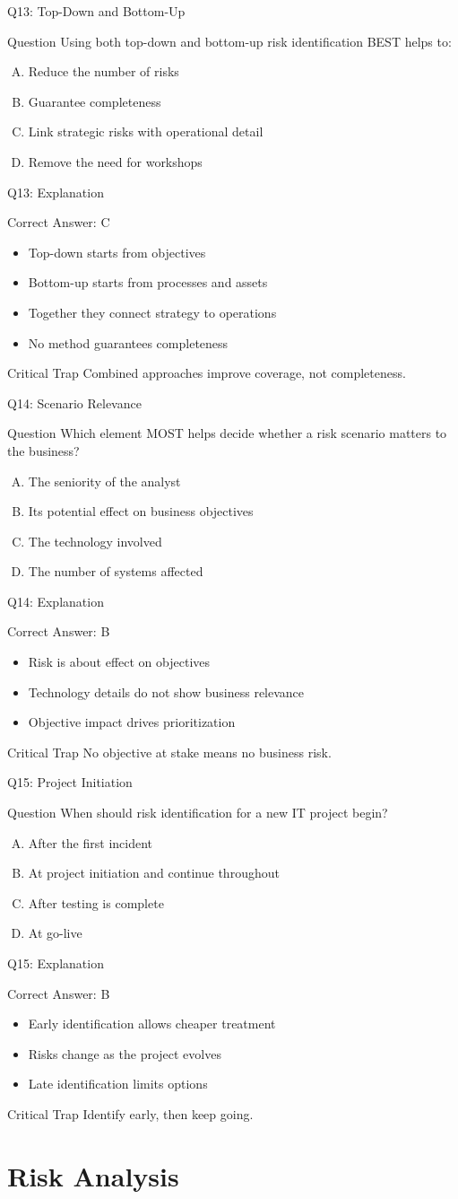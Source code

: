 \documentclass[aspectratio=169]{beamer}
\newcommand{\hq}[7]{%
	\begin{frame}{Q#1: #2}
		\begin{block}{Question}
			#3
		\end{block}
		\begin{enumerate}[(A)]
			#4
		\end{enumerate}
	\end{frame}
	\begin{frame}{Q#1: Explanation}
		\begin{block}{Correct Answer: #5}
			\begin{itemize}
				#6
			\end{itemize}
		\end{block}
		\begin{alertblock}{Critical Trap}
			#7
		\end{alertblock}
	\end{frame}
}
\begin{document}
	\hq{13}{Top-Down and Bottom-Up}
	{Using both top-down and bottom-up risk identification BEST helps to:}
	{\item Reduce the number of risks
		\item Guarantee completeness
		\item Link strategic risks with operational detail
		\item Remove the need for workshops}
	{C}
	{\item Top-down starts from objectives
		\item Bottom-up starts from processes and assets
		\item Together they connect strategy to operations
		\item No method guarantees completeness}
	{Combined approaches improve coverage, not completeness.}
	
	\hq{14}{Scenario Relevance}
	{Which element MOST helps decide whether a risk scenario matters to the business?}
	{\item The seniority of the analyst
		\item Its potential effect on business objectives
		\item The technology involved
		\item The number of systems affected}
	{B}
	{\item Risk is about effect on objectives
		\item Technology details do not show business relevance
		\item Objective impact drives prioritization}
	{No objective at stake means no business risk.}
	
	\hq{15}{Project Initiation}
	{When should risk identification for a new IT project begin?}
	{\item After the first incident
		\item At project initiation and continue throughout
		\item After testing is complete
		\item At go-live}
	{B}
	{\item Early identification allows cheaper treatment
		\item Risks change as the project evolves
		\item Late identification limits options}
	{Identify early, then keep going.}
	
	\section{Risk Analysis}
	
\end{document}
